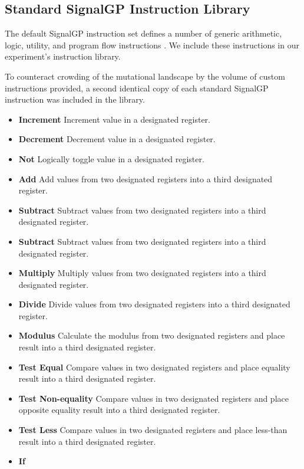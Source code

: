 \subsection{Standard SignalGP Instruction Library} \label{sup:standard_instruction_library}

The default SignalGP instruction set defines a number of generic arithmetic, logic, utility, and program flow instructions \cite{lalejini2018evolving}.
We include these instructions in our experiment's instruction library.

To counteract crowding of the mutational landscape by the volume of custom instructions provided, a second identical copy of each standard SignalGP instruction was included in the library.

\begin{itemize}
\item \textbf{Increment}
Increment value in a designated register.
\item \textbf{Decrement}
Decrement value in a designated register.
\item \textbf{Not}
Logically toggle value in a designated register.
\item \textbf{Add}
Add values from two designated registers into a third designated register.
\item \textbf{Subtract}
Subtract values from two designated registers into a third designated register.
\item \textbf{Subtract}
Subtract values from two designated registers into a third designated register.
\item \textbf{Multiply}
Multiply values from two designated registers into a third designated register.
\item \textbf{Divide}
Divide values from two designated registers into a third designated register.
\item \textbf{Modulus}
Calculate the modulus from two designated registers and place result into a third designated register.
\item \textbf{Test Equal}
Compare values in two designated registers and place equality result into a third designated register.
\item \textbf{Test Non-equality}
Compare values in two designated registers and place opposite equality result into a third designated register.
\item \textbf{Test Less}
Compare values in two designated registers and place less-than result into a third designated register.
\item \textbf{If}

\end{itemize}
